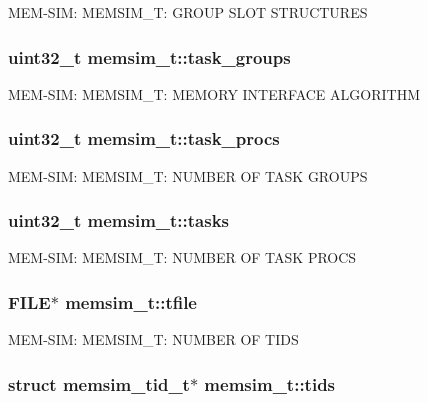 M\-E\-M-\/\-S\-I\-M\-: M\-E\-M\-S\-I\-M\-\_\-\-T\-: G\-R\-O\-U\-P S\-L\-O\-T S\-T\-R\-U\-C\-T\-U\-R\-E\-S \hypertarget{structmemsim__t_ac893c94cb9e4cb525baa4a4352ef6269}{
\subsubsection[{task\-\_\-groups}]{\setlength{\rightskip}{0pt plus 5cm}uint32\-\_\-t memsim\-\_\-t\-::task\-\_\-groups}}\label{structmemsim__t_ac893c94cb9e4cb525baa4a4352ef6269}
M\-E\-M-\/\-S\-I\-M\-: M\-E\-M\-S\-I\-M\-\_\-\-T\-: M\-E\-M\-O\-R\-Y I\-N\-T\-E\-R\-F\-A\-C\-E A\-L\-G\-O\-R\-I\-T\-H\-M \hypertarget{structmemsim__t_a13c682d9789b022f02fbeafcdc2a0866}{
\subsubsection[{task\-\_\-procs}]{\setlength{\rightskip}{0pt plus 5cm}uint32\-\_\-t memsim\-\_\-t\-::task\-\_\-procs}}\label{structmemsim__t_a13c682d9789b022f02fbeafcdc2a0866}
M\-E\-M-\/\-S\-I\-M\-: M\-E\-M\-S\-I\-M\-\_\-\-T\-: N\-U\-M\-B\-E\-R O\-F T\-A\-S\-K G\-R\-O\-U\-P\-S \hypertarget{structmemsim__t_a907d500eb21a9b3c8813ed0e639d806c}{
\subsubsection[{tasks}]{\setlength{\rightskip}{0pt plus 5cm}uint32\-\_\-t memsim\-\_\-t\-::tasks}}\label{structmemsim__t_a907d500eb21a9b3c8813ed0e639d806c}
M\-E\-M-\/\-S\-I\-M\-: M\-E\-M\-S\-I\-M\-\_\-\-T\-: N\-U\-M\-B\-E\-R O\-F T\-A\-S\-K P\-R\-O\-C\-S \hypertarget{structmemsim__t_a0bdb5e96cb3acca8a4ec5daea271243d}{
\subsubsection[{tfile}]{\setlength{\rightskip}{0pt plus 5cm}F\-I\-L\-E$\ast$ memsim\-\_\-t\-::tfile}}\label{structmemsim__t_a0bdb5e96cb3acca8a4ec5daea271243d}
M\-E\-M-\/\-S\-I\-M\-: M\-E\-M\-S\-I\-M\-\_\-\-T\-: N\-U\-M\-B\-E\-R O\-F T\-I\-D\-S \hypertarget{structmemsim__t_acbb8fb6d4f5d4b4a918cb611fb113327}{
\subsubsection[{tids}]{\setlength{\rightskip}{0pt plus 5cm}struct {\bf memsim\-\_\-tid\-\_\-t}$\ast$ memsim\-\_\-t\-::tids}}\label{structmemsim__t_acbb8fb6d4f5d4b4a918cb611fb113327}
